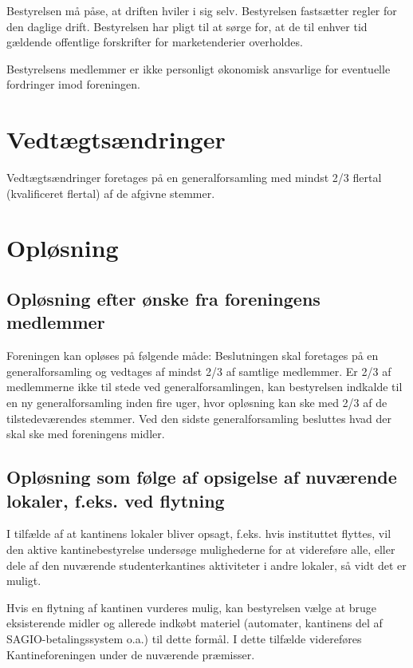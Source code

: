 \documentclass[a4paper, 10pt]{article}
\begin{document}
Bestyrelsen må påse, at driften hviler i sig selv. Bestyrelsen
fastsætter regler for den daglige drift. Bestyrelsen har pligt til at
sørge for, at de til enhver tid gældende offentlige forskrifter for
marketenderier overholdes.

Bestyrelsens medlemmer er ikke personligt økonomisk ansvar\-lige for
eventuelle fordringer imod foreningen.

\section{Vedtægtsændringer}

Vedtægtsændringer foretages på en generalforsamling med mindst 2/3
flertal (kvalificeret flertal) af de afgivne stemmer.

\section{Opløsning}

\subsection*{Opløsning efter ønske fra foreningens medlemmer}

Foreningen kan opløses på følgende måde: Beslutningen skal foretages
på en generalforsamling og vedtages af mindst 2/3 af samtlige
medlemmer. Er 2/3 af medlemmerne ikke til stede ved
generalforsamlingen, kan bestyrelsen indkalde til en ny
generalforsamling inden fire uger, hvor opløsning kan ske med 2/3 af
de tilstedeværendes stemmer. Ved den sidste generalforsamling
besluttes hvad der skal ske med foreningens midler.

\subsection*{Opløsning som følge af opsigelse af nuværende lokaler,
f.eks. ved flytning}

I tilfælde af at kantinens lokaler bliver opsagt, f.eks. hvis
instituttet flyttes, vil den aktive kantinebestyrelse undersøge
mulighederne for at videreføre alle, eller dele af den nuværende
studenterkantines aktiviteter i andre lokaler, så vidt det er muligt.

Hvis en flytning af kantinen vurderes mulig, kan bestyrelsen vælge at
bruge eksisterende midler og allerede indkøbt materiel (automater,
kantinens del af SAGIO-betalingssystem o.a.) til dette formål. I dette
tilfælde videreføres Kantineforeningen under de nuværende præmisser.
\end{document}

